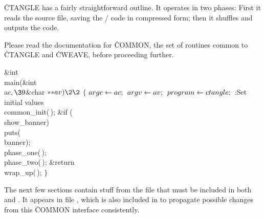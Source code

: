 \.{CTANGLE} has a fairly straightforward outline.  It operates in
two phases: First it reads the source file, saving the \CEE/ code in
compressed form; then it shuffles and outputs the code.

Please read the documentation for \.{COMMON}, the set of routines common
to \.{CTANGLE} and \.{CWEAVE}, before proceeding further.

\Y\B\1\1\&{int} \\{main}(\&{int} \\{ac}${},\39{}$\&{char} ${}{*}{*}\\{av})\2%
\2{}$\6
${}\{{}$\1\6
${}\\{argc}\leftarrow\\{ac};{}$\6
${}\\{argv}\leftarrow\\{av};{}$\6
${}\\{program}\leftarrow\\{ctangle};{}$\6
:Set initial values\X\6
\\{common\_init}(\,);\6
\&{if} (\\{show\_banner})\1\5
\\{puts}(\\{banner});\2\6
\\{phase\_one}(\,);\6
\\{phase\_two}(\,);\6
\&{return} \\{wrap\_up}(\,);\6
\4${}\}{}$\2\par
\fi

The next few sections contain stuff from the file  that
must
be included in both  and . It appears in
file , which is also included in  to
propagate
possible changes from this \.{COMMON} interface consistently.




